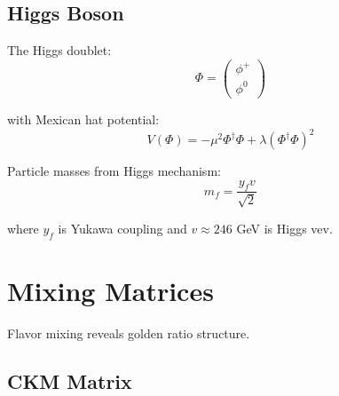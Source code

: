 \begin{table}[h]
\centering
\caption{Gauge Boson Properties}
\end{table}

\subsection{Higgs Boson}

\begin{definition}
\label{def:higgs}
The Higgs doublet:
\begin{equation}
\Phi = \begin{pmatrix}\phi^+ \\ \phi^0\end{pmatrix}
\end{equation}

with Mexican hat potential:
\begin{equation}
V(\Phi) = -\mu^2\Phi^\dagger\Phi + \lambda(\Phi^\dagger\Phi)^2
\end{equation}
\end{definition}

\begin{proposition}
\label{prop:higgs-mass}
Particle masses from Higgs mechanism:
\begin{equation}
m_f = \frac{y_f v}{\sqrt{2}}
\end{equation}

where $y_f$ is Yukawa coupling and $v \approx 246$ GeV is Higgs vev.
\end{proposition}

\section{Mixing Matrices}

Flavor mixing reveals golden ratio structure.

\subsection{CKM Matrix}


